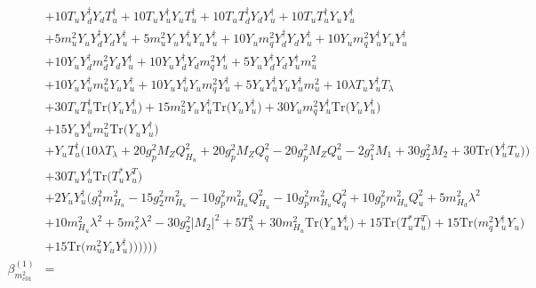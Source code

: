  \begin{align} 
 & +10 {T_u  Y_{d}^{\dagger}  Y_d  T_{u}^{\dagger}} +10 {T_u  Y_{u}^{\dagger}  Y_u  T_{u}^{\dagger}} +10 {T_u  T_{d}^{\dagger}  Y_d  Y_{u}^{\dagger}} +10 {T_u  T_{u}^{\dagger}  Y_u  Y_{u}^{\dagger}} \nonumber \\ 
 &+5 {m_u^2  Y_u  Y_{d}^{\dagger}  Y_d  Y_{u}^{\dagger}} +5 {m_u^2  Y_u  Y_{u}^{\dagger}  Y_u  Y_{u}^{\dagger}} +10 {Y_u  m_q^2  Y_{d}^{\dagger}  Y_d  Y_{u}^{\dagger}} +10 {Y_u  m_q^2  Y_{u}^{\dagger}  Y_u  Y_{u}^{\dagger}} \nonumber \\ 
 &+10 {Y_u  Y_{d}^{\dagger}  m_d^2  Y_d  Y_{u}^{\dagger}} +10 {Y_u  Y_{d}^{\dagger}  Y_d  m_q^2  Y_{u}^{\dagger}} +5 {Y_u  Y_{d}^{\dagger}  Y_d  Y_{u}^{\dagger}  m_u^2} \nonumber \\ 
 &+10 {Y_u  Y_{u}^{\dagger}  m_u^2  Y_u  Y_{u}^{\dagger}} +10 {Y_u  Y_{u}^{\dagger}  Y_u  m_q^2  Y_{u}^{\dagger}} +5 {Y_u  Y_{u}^{\dagger}  Y_u  Y_{u}^{\dagger}  m_u^2} +10 \lambda {T_u  Y_{u}^{\dagger}} T_{\lambda} \nonumber \\ 
 &+30 {T_u  T_{u}^{\dagger}} \mbox{Tr}\Big({Y_u  Y_{u}^{\dagger}}\Big) +15 {m_u^2  Y_u  Y_{u}^{\dagger}} \mbox{Tr}\Big({Y_u  Y_{u}^{\dagger}}\Big) +30 {Y_u  m_q^2  Y_{u}^{\dagger}} \mbox{Tr}\Big({Y_u  Y_{u}^{\dagger}}\Big) \nonumber \\ 
 &+15 {Y_u  Y_{u}^{\dagger}  m_u^2} \mbox{Tr}\Big({Y_u  Y_{u}^{\dagger}}\Big) \nonumber \\ 
 &+{Y_u  T_{u}^{\dagger}} \Big(10 \lambda T_{\lambda}  + 20 g_{p}^{2} M_Z Q_{H_u}^{2}  + 20 g_{p}^{2} M_Z Q_{q}^{2}  -20 g_{p}^{2} M_Z Q_{u}^{2}  -2 g_{1}^{2} M_1  + 30 g_{2}^{2} M_2  + 30 \mbox{Tr}\Big({Y_{u}^{\dagger}  T_u}\Big) \Big)\nonumber \\ 
 &+30 {T_u  Y_{u}^{\dagger}} \mbox{Tr}\Big({T_u^*  Y_{u}^{T}}\Big) \nonumber \\ 
 &+2 {Y_u  Y_{u}^{\dagger}} \Big(g_{1}^{2} m_{H_u}^2 -15 g_{2}^{2} m_{H_u}^2 -10 g_{p}^{2} m_{H_u}^2 Q_{H_u}^{2} -10 g_{p}^{2} m_{H_u}^2 Q_{q}^{2} +10 g_{p}^{2} m_{H_u}^2 Q_{u}^{2} +5 m_{H_d}^2 \lambda^{2} \nonumber \\ 
 &+10 m_{H_u}^2 \lambda^{2} +5 m^2_{s} \lambda^{2} -30 g_{2}^{2} |M_2|^2 +5 T_{\lambda}^{2} +30 m_{H_u}^2 \mbox{Tr}\Big({Y_u  Y_{u}^{\dagger}}\Big) +15 \mbox{Tr}\Big({T_u^*  T_{u}^{T}}\Big) +15 \mbox{Tr}\Big({m_q^2  Y_{u}^{\dagger}  Y_u}\Big) \nonumber \\ 
 &+15 \mbox{Tr}\Big({m_u^2  Y_u  Y_{u}^{\dagger}}\Big) \Big)\Big)\Big)\Big)\Big)\\ 
\beta_{m^2_{e01}}^{(1)} & =  

\end{align}
